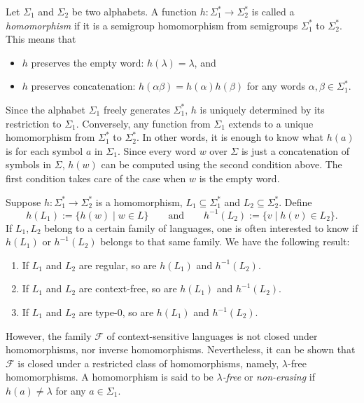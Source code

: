 \documentclass[12pt]{article}
\begin{document}
Let $\Sigma_1$ and $\Sigma_2$ be two alphabets.  A function $h: \Sigma_1^* \to \Sigma_2^*$ is called a \emph{homomorphism} if it is a semigroup homomorphism from semigroups $\Sigma_1^*$ to $\Sigma_2^*$.  This means that
\begin{itemize}
\item $h$ preserves the empty word: $h(\lambda)=\lambda$, and
\item $h$ preserves concatenation: $h(\alpha\beta)=h(\alpha)h(\beta)$ for any words $\alpha,\beta\in \Sigma_1^*$.
\end{itemize}

Since the alphabet $\Sigma_1$ freely generates $\Sigma_1^*$, $h$ is uniquely determined by its restriction to $\Sigma_1$.  Conversely, any function from $\Sigma_1$ extends to a unique homomorphism from $\Sigma_1^*$ to $\Sigma_2^*$.  In other words, it is enough to know what $h(a)$ is for each symbol $a$ in $\Sigma_1$.  Since every word $w$ over $\Sigma$ is just a concatenation of symbols in $\Sigma$, $h(w)$ can be computed using the second condition above.  The first condition takes care of the case when $w$ is the empty word.

Suppose $h:\Sigma_1^* \to \Sigma_2^*$ is a homomorphism, $L_1\subseteq \Sigma_1^*$ and $L_2\subseteq \Sigma_2^*$.  Define $$h(L_1):=\lbrace h(w)\mid w\in L\rbrace \qquad\mbox{and}\qquad h^{-1}(L_2):=\lbrace v\mid h(v)\in L_2\rbrace.$$  If $L_1,L_2$ belong to a certain family of languages, one is often interested to know if $h(L_1)$ or $h^{-1}(L_2)$ belongs to that same family.  We have the following result:
\begin{enumerate}
\item If $L_1$ and $L_2$ are regular, so are $h(L_1)$ and $h^{-1}(L_2)$.
\item If $L_1$ and $L_2$ are context-free, so are $h(L_1)$ and $h^{-1}(L_2)$.
\item If $L_1$ and $L_2$ are type-0, so are $h(L_1)$ and $h^{-1}(L_2)$.
\end{enumerate}

However, the family $\mathscr{F}$ of context-sensitive languages is not closed under homomorphisms, nor inverse homomorphisms.  Nevertheless, it can be shown that $\mathscr{F}$ is closed under a restricted class of homomorphisms, namely, $\lambda$-free homomorphisms.  A homomorphism is said to be \emph{$\lambda$-free} or \emph{non-erasing} if $h(a)\ne \lambda$ for any $a\in \Sigma_1$.
\end{document}
